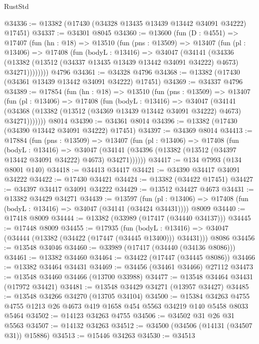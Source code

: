 \begin{lexlean}{RustStd}
\begin{coremodule}
@34336 := @13382 (@17430 (@34328 @13435 @13439 @13442 @34091 @34222) @17451)
@34337 := @34301 @8045
@34360 := @13600
    (fun (D : @4551) =>
    @17407
      (fun (hn : @18) =>
      @13510
        (fun (pns : @13509) =>
        @13407
          (fun (pl : @13406) =>
          @17408
            (fun (bodyL : @13416) =>
            @34047
              (@34141
                (@34336
                  (@13382 (@13512 (@34337 @13435 @13439 @13442 @34091 @34222) @4673) @34271))))))))
    @4796
@34361 := @34328 @4796
@34368 := @13382 (@17430 (@34361 @13439 @13442 @34091 @34222) @17451)
@34369 := @34337 @4796
@34389 := @17854
    (fun (hn : @18) =>
    @13510
      (fun (pns : @13509) =>
      @13407
        (fun (pl : @13406) =>
        @17408
          (fun (bodyL : @13416) =>
          @34047
            (@34141
              (@34368 (@13382 (@13512 (@34369 @13439 @13442 @34091 @34222) @4673) @34271)))))))
    @8014
@34390 := @34361 @8014
@34396 := @13382 (@17430 (@34390 @13442 @34091 @34222) @17451)
@34397 := @34369 @8014
@34413 := @17884
    (fun (pns : @13509) =>
    @13407
      (fun (pl : @13406) =>
      @17408
        (fun (bodyL : @13416) =>
        @34047 (@34141 (@34396 (@13382 (@13512 (@34397 @13442 @34091 @34222) @4673) @34271))))))
@34417 := @134 @7993 (@134 @8001 @140)
@34418 := @34413 @34417
@34421 := @34390 @34417 @34091 @34222
@34422 := @17430 @34421
@34424 := @13382 (@34422 @17451)
@34427 := @34397 @34417 @34091 @34222
@34429 := @13512 @34427 @4673
@34431 := @13382 @34429 @34271
@34439 := @13597
    (fun (pl : @13406) => @17408 (fun (bodyL : @13416) => @34047 (@34141 (@34424 @34431))))
    @8009
@34440 := @17418 @8009
@34444 := @13382 (@33989 (@17417 (@34440 @34137)))
@34445 := @17448 @8009
@34455 := @17935
    (fun (bodyL : @13416) => @34047 (@34444 (@13382 (@34422 (@17447 (@34445 @13400))) @34431)))
    @8086
@34456 := @13548 @34046
@34460 := @33989 (@17417 (@34440 (@34136 @8086)))
@34461 := @13382 @34460
@34464 := @34422 (@17447 (@34445 @8086))
@34466 := @13382 @34464 @34431
@34469 := @34456 (@34461 @34466) @27112
@34473 := @13548 @34460 @34466 (@13700 @33988)
@34477 := @13548 @34464 @34431 (@17972 @34421)
@34481 := @13548 @34429 @34271 (@13957 @34427)
@34485 := @13548 @34266 @34270 (@13705 @34104)
@34500 := @15384
    @34263
    @4755
    @4755
    @1213
    @26
    @4673
    @419
    @1658
    @454
    @5563
    @34219
    @140
    @5458
    @8033
    @5464
@34502 := @14123 @34263 @4755
@34506 := @34502 @31 @26 @31 @5563
@34507 := @14132 @34263
@34512 := @34500 (@34506 (@14131 (@34507 @31)) @15886)
@34513 := @15446 @34263
@34530 := @34513

\end{coremodule}
\end{lexlean}
